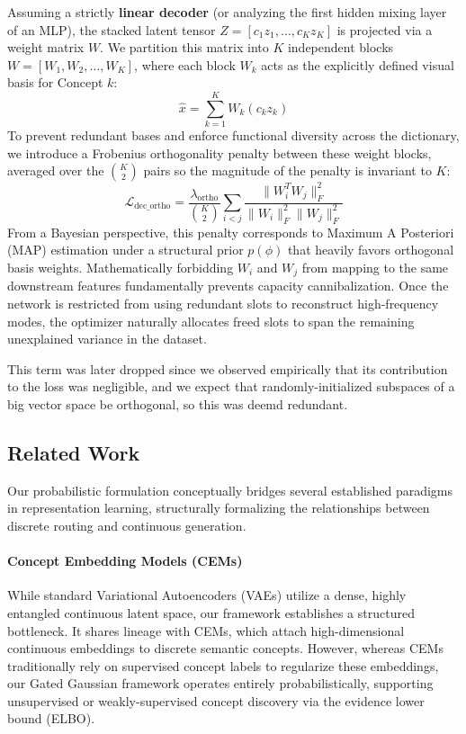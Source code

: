 \documentclass[11pt, a4paper]{article}
\begin{document}
Assuming a strictly \textbf{linear decoder} (or analyzing the first hidden mixing layer of an MLP), the stacked latent tensor $Z = [c_1 z_1, \dots, c_K z_K]$ is projected via a weight matrix $W$. We partition this matrix into $K$ independent blocks $W = [W_1, W_2, \dots, W_K]$, where each block $W_k$ acts as the explicitly defined visual basis for Concept $k$:
\[
\hat{x} = \sum_{k=1}^K W_k (c_k z_k)
\]
To prevent redundant bases and enforce functional diversity across the dictionary, we introduce a Frobenius orthogonality penalty between these weight blocks, averaged over the $\binom{K}{2}$ pairs so the magnitude of the penalty is invariant to $K$:
\[
\mathcal{L}_{\text{dec\_ortho}} = \frac{\lambda_{\text{ortho}}}{\binom{K}{2}} \sum_{i < j} \frac{\| W_i^T W_j \|_F^2}{\|W_i\|_F^2 \|W_j\|_F^2}
\]
From a Bayesian perspective, this penalty corresponds to Maximum A Posteriori (MAP) estimation under a structural prior $p(\phi)$ that heavily favors orthogonal basis weights. Mathematically forbidding $W_i$ and $W_j$ from mapping to the same downstream features fundamentally prevents capacity cannibalization. Once the network is restricted from using redundant slots to reconstruct high-frequency modes, the optimizer naturally allocates freed slots to span the remaining unexplained variance in the dataset.

{\color{red}This term was later dropped since we observed empirically that its contribution to the loss was negligible, and we expect that randomly-initialized subspaces of a big vector space be orthogonal, so this was deemd redundant.}

\subsection{Related Work}

Our probabilistic formulation conceptually bridges several established paradigms in representation learning, structurally formalizing the relationships between discrete routing and continuous generation.

\paragraph{Concept Embedding Models (CEMs)} 
While standard Variational Autoencoders (VAEs) utilize a dense, highly entangled continuous latent space, our framework establishes a structured bottleneck. It shares lineage with CEMs, which attach high-dimensional continuous embeddings to discrete semantic concepts. However, whereas CEMs traditionally rely on supervised concept labels to regularize these embeddings, our Gated Gaussian framework operates entirely probabilistically, supporting unsupervised or weakly-supervised concept discovery via the evidence lower bound (ELBO).
\end{document}
